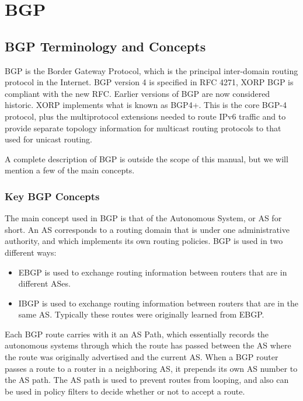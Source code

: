 %
%

\chapter{BGP}
\label{bgp}
\section{BGP Terminology and Concepts}

BGP is the Border Gateway Protocol, which is the principal inter-domain
routing protocol in the Internet.  BGP version 4 is specified in RFC
4271,  XORP BGP is compliant with the new RFC.  Earlier
versions of BGP are now considered historic.  XORP implements what is
known as BGP4+.  This is the core BGP-4 protocol, plus the
multiprotocol extensions needed to route IPv6 traffic and to provide
separate topology information for multicast routing protocols to that
used for unicast routing.

A complete description of BGP is outside the scope of this manual, but
we will mention a few of the main concepts.  

\subsection{Key BGP Concepts}

The main concept used in BGP is that of the Autonomous System, or AS
for short.  An AS corresponds to a routing domain that is under one
administrative authority, and which implements its own routing
policies.  BGP is used in two different ways:
\begin{itemize}
\item EBGP is used to exchange routing information between routers
that are in different ASes.
\item IBGP is used to exchange routing information between routers
that are in the same AS.  Typically these routes were originally
learned from EBGP.
\end{itemize}
Each BGP route carries with it an AS Path, which essentially records
the autonomous systems through which the route has passed between the
AS where the route was originally advertised and the current AS.  When
a BGP router passes a route to a router in a neighboring AS, it
prepends its own AS number to the AS path.  The AS path is used to
prevent routes from looping, and also can be used in policy filters to
decide whether or not to accept a route.

